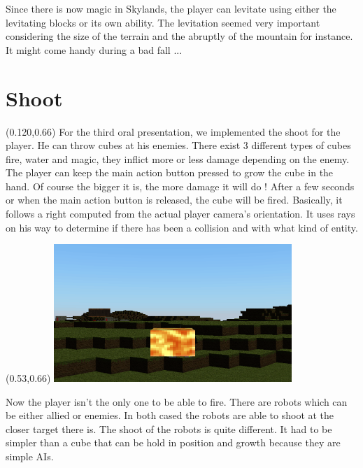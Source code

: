 \documentclass[article]{report}         %
\begin{document}
Since there is now magic in Skylands, the player can levitate using either the levitating blocks or its own ability. The levitation seemed very important considering the size of the terrain and the abruptly of the mountain for instance. It might come handy during a bad fall ...

      \section{Shoot}

 \begin{textblock}{0.4}(0.120,0.66)
  For the third oral presentation, we implemented the shoot for the player. He can throw cubes at his enemies. There exist 3 different types of cubes fire, water and magic, they inflict more or less damage depending on the enemy.\\

The player can keep the main action button pressed to grow the cube in the hand. Of course the bigger it is, the more damage it will do ! After a few seconds or when the main action button is released, the cube will be fired.
Basically, it follows a right computed from the actual player camera's orientation. It uses rays on his way to determine if there has been a collision and with what kind of entity.\\
    \end{textblock}

    \begin{textblock}{0.6}(0.53,0.66)
    \includegraphics[width=9cm]{images/Physics/FireCube.png}
    \end{textblock}
\newpage

Now the player isn't the only one to be able to fire. There are robots which can be either allied or enemies. In both cased the robots are able to shoot at the closer target there is. The shoot of the robots is quite different. It had to be simpler than a cube that can be hold in position and growth because they are simple AIs.\\
\end{document}
